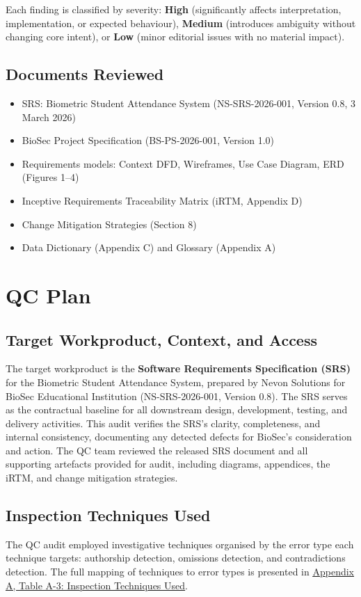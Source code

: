 \documentclass[11pt,a4paper]{article}
\let\orighyperref\hyperref
\renewcommand{\hyperref}[2][]{\orighyperref[#1]{\uline{#2}}}
\begin{document}
Each finding is classified by severity: \textbf{High} (significantly affects interpretation, implementation, or expected behaviour), \textbf{Medium} (introduces ambiguity without changing core intent), or \textbf{Low} (minor editorial issues with no material impact).

\subsection{Documents Reviewed}
\begin{itemize}[leftmargin=*, nosep]
\item SRS: Biometric Student Attendance System (NS-SRS-2026-001, Version 0.8, 3 March 2026)
\item BioSec Project Specification (BS-PS-2026-001, Version 1.0)
\item Requirements models: Context DFD, Wireframes, Use Case Diagram, ERD (Figures 1--4)
\item Inceptive Requirements Traceability Matrix (iRTM, Appendix D)
\item Change Mitigation Strategies (Section 8)
\item Data Dictionary (Appendix C) and Glossary (Appendix A)
\end{itemize}

\section{QC Plan}

\subsection{Target Workproduct, Context, and Access}
The target workproduct is the \textbf{Software Requirements Specification (SRS)} for the Biometric Student Attendance System, prepared by Nevon Solutions for BioSec Educational Institution (NS-SRS-2026-001, Version 0.8). The SRS serves as the contractual baseline for all downstream design, development, testing, and delivery activities. This audit verifies the SRS's clarity, completeness, and internal consistency, documenting any detected defects for BioSec's consideration and action. The QC team reviewed the released SRS document and all supporting artefacts provided for audit, including diagrams, appendices, the iRTM, and change mitigation strategies.

\subsection{Inspection Techniques Used}
The QC audit employed investigative techniques organised by the error type each technique targets: authorship detection, omissions detection, and contradictions detection. The full mapping of techniques to error types is presented in \hyperref[tab:qc-techniques]{Appendix A, Table A-3: Inspection Techniques Used}.
\end{document}
